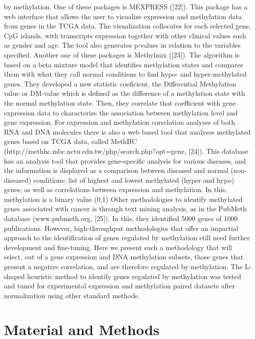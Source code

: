 \documentclass[10pt,letterpaper]{article}
\begin{document}
by methylation. One of these packages is MEXPRESS ({[}22{]}).
This package has a web interface that allows the user to visualize
expression and methylation data from genes in the TCGA data. The
visualization collocates for each selected gene, CpG islands, with
transcripts expression together with other clinical values such as
gender and age. The tool also generates p-values in relation to the
variables specified. Another one of these packages is Methylmix ({[}23{]}).
The algorithm is based on a beta mixture model that identifies
methylation states and compares them with what they call normal
conditions to find hypo- and hyper-methylated genes. They developed a
new statistic coeficient, the Differential Methylation value or DM-value
which is defined as the difference of a methylation state with the
normal methylation state. Then, they correlate that coefficient with
gene expression data to characterize the association between methylation
level and gene expression. For expression and methylation correlation
analyses of both RNA and DNA molecules there is also a web based tool
that analyses methylated genes based on TCGA data, called MethHC
(http://methhc.mbc.nctu.edu.tw/php/search.php?opt=gene, {[}24{]}). This database
has an analysis tool that provides gene-specific analysis for various diseases, 
and the information is displayed as a comparison between diseased and normal 
(non-diseased) conditions; list of highest and lowest methylated 
(hyper and hypo) genes; as well as correlations between expression and 
methylation. In this, methylation is a binary value (0,1) Other methodologies 
to identify methylated genes associated with cancer is through text mining 
analysis, as in the PubMeth database (www.pubmeth.org, {[}25{]}). In this, they 
identified 5000 genes of 1000 publications. However, high-throughput 
methodologies that offer an impartial approach to the identification of genes
regulated by methylation still need further development and fine-tuning.
Here we present such a methodology that will select, out of a gene
expression and DNA methylation subsets, those genes that present a
negative correlation, and are therefore regulated by methylation. The
L-shaped heuristic method to identify genes regulated by methylation was
tested and tuned for experimental expression and methylation paired
datasets after normalization using other standard methods.

\hypertarget{material-and-methods}{%
\section{Material and Methods}\label{material-and-methods}}
\end{document}
